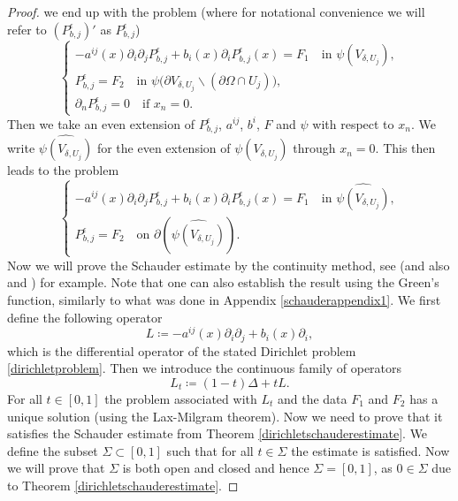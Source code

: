 \documentclass[12pt,a4paper]{article}
\theoremstyle{definition}
\theoremstyle{remark}
\numberwithin{equation}{section}
\begin{document}
\begin{appendices}
\begin{proof}
we end up with the problem (where for notational convenience we will refer to $(P^\epsilon_{b,j})'$ as $P^\epsilon_{b,j}$)
\begin{equation}
\begin{cases}
- a^{ij} (x) \partial_i \partial_j P^\epsilon_{b,j} + b_i (x) \partial_i P^\epsilon_{b,j} (x) = F_1 \quad \text{in } \psi (V_{\delta,U_j}) , \\
P^\epsilon_{b,j} = F_2 \quad \text{in } \psi \big(\partial V_{\delta, U_j} \backslash (\partial \Omega \cap U_j) \big), \\
\partial_n P^\epsilon_{b,j} = 0 \quad \text{if } x_n = 0.
\end{cases}
\end{equation}
Then we take an even extension of $P^\epsilon_{b,j}$, $a^{ij}$, $b^i$, $F$ and $\psi$ with respect to $x_n$. We write $\widehat{\psi( V_{\delta, U_j})}$ for the even extension of $\psi(V_{\delta, U_j})$ through $x_n = 0$. This then leads to the problem
\begin{equation} \label{dirichletproblem}
\begin{cases}
- a^{ij} (x) \partial_i \partial_j  P^\epsilon_{b,j} + b_i (x) \partial_i P^\epsilon_{b,j} (x) = F_1 \quad \text{in } \widehat{\psi(V_{\delta, U_j})}, \\
P^\epsilon_{b,j} = F_2 \quad \text{on } \partial (\widehat{\psi(V_{\delta, U_j})} ).
\end{cases}
\end{equation}
Now we will prove the Schauder estimate by the continuity method, see \cite[~Section 5.5.1]{giaquinta} (and also \cite[~Section 13.3]{jostPDE} and \cite[~Section 5.2]{gilbarg}) for example. Note that one can also establish the result using the Green's function, similarly to what was done in Appendix \ref{schauderappendix1}. We first define the following operator
\begin{equation*}
L \coloneqq - a^{ij} (x) \partial_i \partial_j + b_i (x) \partial_i,
\end{equation*}
which is the differential operator of the stated Dirichlet problem \eqref{dirichletproblem}. Then we introduce the continuous family of operators
\begin{equation*}
L_t \coloneqq (1 - t) \Delta + t L.
\end{equation*}
For all $t \in [0,1]$ the problem associated with $L_t$ and the data $F_1$ and $F_2$ has a unique solution (using the Lax-Milgram theorem). Now we need to prove that it satisfies the Schauder estimate from Theorem \ref{dirichletschauderestimate}. We define the subset $\Sigma \subset [0,1]$ such that for all $t \in \Sigma$ the estimate is satisfied. Now we will prove that $\Sigma$ is both open and closed and hence $\Sigma = [0,1]$, as $0 \in \Sigma$ due to Theorem \ref{dirichletschauderestimate}.


\end{proof}
\end{appendices}
\end{document}
